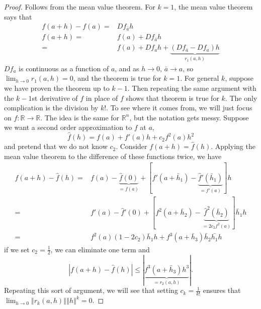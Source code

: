 \documentclass[12pt,reqno]{amsart}
\theoremstyle{definition}
\def\R{\mathbb{R}}
\newcommand{\norm}[1]{\left\Vert {#1} \right\Vert}
\renewcommand{\to}{{\rightarrow}}
\begin{document}
\begin{proof}
  Follows from the mean value theorem. For $k=1$, the mean value
  theorem says that
  \begin{align*}
    f(a+h) - f(a) = & Df_{\bar{a}} h \\
    f(a+h) = & f(a) + Df_{\bar{a}} h \\
    = & f(a) + Df_{a} h + \underbrace{(Df_{\bar{a}} -Df_a)h}_{r_1(a,h)}  
  \end{align*}
  $Df_a$ is continuous as a function of $a$, and as $h \to 0$,
  $\bar{a} \to a$, so $\lim_{h \to 0} r_1(a,h) = 0$, and the theorem
  is true for $k = 1$. For general $k$, suppose we have proven the
  theorem up to $k-1$. Then repeating the same argument with the
  $k-1$st derivative of $f$ in place of $f$ shows that theorem is true
  for $k$. The only complication is the division by $k!$. To see where
  it comes from, we will just focus on $f:\R \to \R$. The idea is the
  same for $\R^n$, but the notation gets messy. Suppose we want a
  second order approximation to $f$ at $a$, 
  \[ \hat{f}(h) = f(a) + f'(a) h + c_2 f^2(a) h^2 \] and pretend that we
  do not know $c_2$. Consider $f(a+h) = \hat{f}(h)$. Applying the mean value
  theorem to the difference of these functions twice, we have
  \begin{align*}
    f(a+h) - \hat{f}(h) = & f(a)-\underbrace{\hat{f}(0)}_{=f(a)}
    + \left[ f'(a + \bar{h}_1) -
      \underbrace{\hat{f}'(\bar{h}_1)}_{=f'(a)}\right] h \\
    = & f'(a) - \hat{f}'(0) + \left[f^{2}(a+\bar{h}_2) -
      \underbrace{\hat{f}^2(\bar{h}_2)}_{=2c_2 f^2(a)}\right] \bar{h}_1 h \\
    = & f^2(a) (1 - 2c_2) \bar{h}_1 h +
    f^3(a + \bar{h}_3)\bar{h}_2\bar{h_1} h 
  \end{align*}
  if we set $c_2 = \frac{1}{2}$, we can eliminate one term and 
  \[ |f(a+h) - \hat{f}(h) | \leq | \underbrace{f^3(a + \bar{h}_3)
    h^3}_{=r_2(a,h)} |.\]  
  Repeating this sort of argument, we will see that setting $c_k =
  \frac{1}{k!}$ ensures that $\lim_{h \to 0}
  \norm{r_k(a,h)}{\norm{h}^k}  = 0$.
\end{proof}
\end{document}
